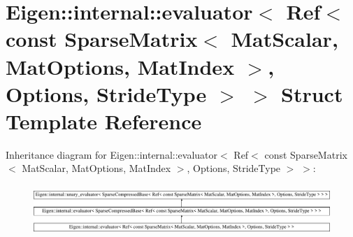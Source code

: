 \hypertarget{struct_eigen_1_1internal_1_1evaluator_3_01_ref_3_01const_01_sparse_matrix_3_01_mat_scalar_00_01_17d98bf798af280639e961c8a27d545c}{}\section{Eigen\+::internal\+::evaluator$<$ Ref$<$ const Sparse\+Matrix$<$ Mat\+Scalar, Mat\+Options, Mat\+Index $>$, Options, Stride\+Type $>$ $>$ Struct Template Reference}
\label{struct_eigen_1_1internal_1_1evaluator_3_01_ref_3_01const_01_sparse_matrix_3_01_mat_scalar_00_01_17d98bf798af280639e961c8a27d545c}
Inheritance diagram for Eigen\+::internal\+::evaluator$<$ Ref$<$ const Sparse\+Matrix$<$ Mat\+Scalar, Mat\+Options, Mat\+Index $>$, Options, Stride\+Type $>$ $>$\+:\begin{figure}[H]
\begin{center}
\leavevmode
\includegraphics[height=1.920000cm]{struct_eigen_1_1internal_1_1evaluator_3_01_ref_3_01const_01_sparse_matrix_3_01_mat_scalar_00_01_17d98bf798af280639e961c8a27d545c}
\end{center}
\end{figure}
